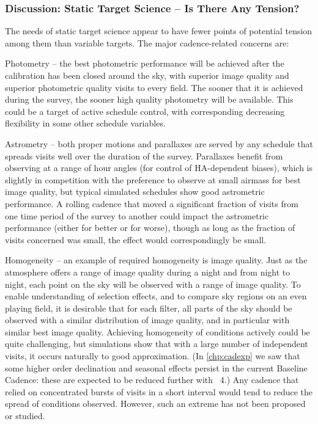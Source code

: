 
\subsubsection{Discussion: Static Target Science -- Is There Any Tension?}

The needs of static target science appear to have fewer points of
potential tension among them than variable targets.  The major
cadence-related concerns are:

\begin{description}

\item{Photometry} -- the best photometric performance will be achieved
after the calibration has been closed around the sky, with superior image
quality and superior photometric quality visits to every field.  The
sooner that it is achieved during the survey, the sooner high quality
photometry will be available.  This could be a target of active schedule
control, with corresponding decreasing flexibility in some other
schedule variables.

\item{Astrometry} -- both proper motions and parallaxes are served by
any schedule that spreads visits well over the duration of the survey.
Parallaxes benefit from observing at a range of hour angles (for control of HA-dependent biases),
which is slightly in competition with the preference to observe at small airmass
for best image quality, but typical simulated schedules show good
astrometric performance. A rolling cadence that moved a significant
fraction of visits from one time period of the survey to another could
impact the astrometric performance (either for better or for worse),
though as long as the fraction of visits concerned was small, the effect
would correspondingly be small.

\item{Homogeneity} -- an  example of required homogeneity is image
quality. Just as the atmosphere offers a range of image quality during a
night and from night to night, each point on the sky will be observed
with a range of image quality.  To enable understanding of selection
effects, and to compare sky regions on an even playing field, it is
desirable that for each filter, all parts of the sky should be observed
with a similar distribution of image quality, and in particular with
similar best image quality. Achieving homogeneity of conditions actively
could be quite challenging, but simulations show that with a large
number of independent visits, it occurs naturally to good approximation.
(In \autoref{chp:cadexp} we saw that some higher order declination and seasonal effects persist in the current Baseline Cadence: these are expected to be reduced further with \OpSim~4.)
Any cadence that relied on concentrated bursts of visits in a short
interval would tend to reduce the spread of conditions observed.
However, such an extreme has not been proposed or studied.


\end{description}
